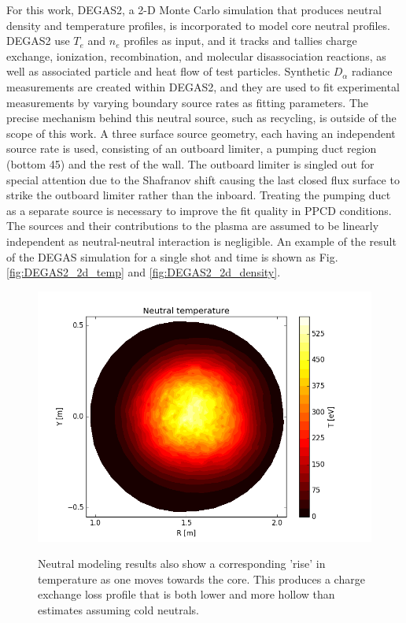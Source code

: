 \documentclass[aip, pop, preprint]{revtex4-1}
\begin{document}
For this work, DEGAS2, a 2-D Monte Carlo simulation that produces neutral density and
temperature profiles\cite{StotlerDEGAS2Manual}, is incorporated to model core neutral profiles. DEGAS2
use  $ T_{e} $ and $ n_{e} $ profiles as input, and it tracks and tallies
charge exchange, ionization, recombination, and molecular disassociation
reactions, as well as associated particle and heat flow of test particles.
Synthetic $ D_{\alpha} $ radiance measurements are created within DEGAS2, and they are
used to fit experimental measurements by varying boundary source rates
as fitting parameters. The precise mechanism behind this neutral source, such
as recycling, is outside of the scope of this work. A three surface source
geometry, each having an independent source rate is used, consisting of an
outboard limiter, a pumping duct region (bottom 45\textdegree) and the rest of
the wall. The outboard limiter is singled out for special attention due to the
Shafranov shift causing the last closed flux surface to strike the outboard
limiter rather than the inboard. Treating the pumping duct as a separate source is necessary to improve the fit quality in PPCD conditions. The sources
and their contributions to the plasma are assumed to be linearly independent as
neutral-neutral interaction is negligible. An example of the result of the
DEGAS simulation for a single shot and time is shown as Fig.
\ref{fig:DEGAS2_2d_temp} and \ref{fig:DEGAS2_2d_density}.

\begin{figure}
	\centering
	\includegraphics[width = 1.\linewidth]{./plots/degas_neutral_t}
	\label{fig:DEGAS2_2d_temp}
	\caption{Neutral modeling results also show a corresponding 'rise' in temperature as one moves towards the core. This produces a charge exchange loss profile that is both lower and more hollow than estimates assuming cold neutrals.}
	\label{fig:DEGAS2_2D}
\end{figure}
\end{document}
